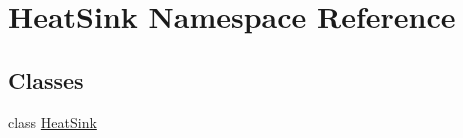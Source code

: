 \hypertarget{namespace_heat_sink}{}\section{Heat\+Sink Namespace Reference}
\label{namespace_heat_sink}
\subsection*{Classes}
\begin{DoxyCompactItemize}
\item 
class \hyperlink{class_heat_sink_1_1_heat_sink}{Heat\+Sink}
\end{DoxyCompactItemize}
